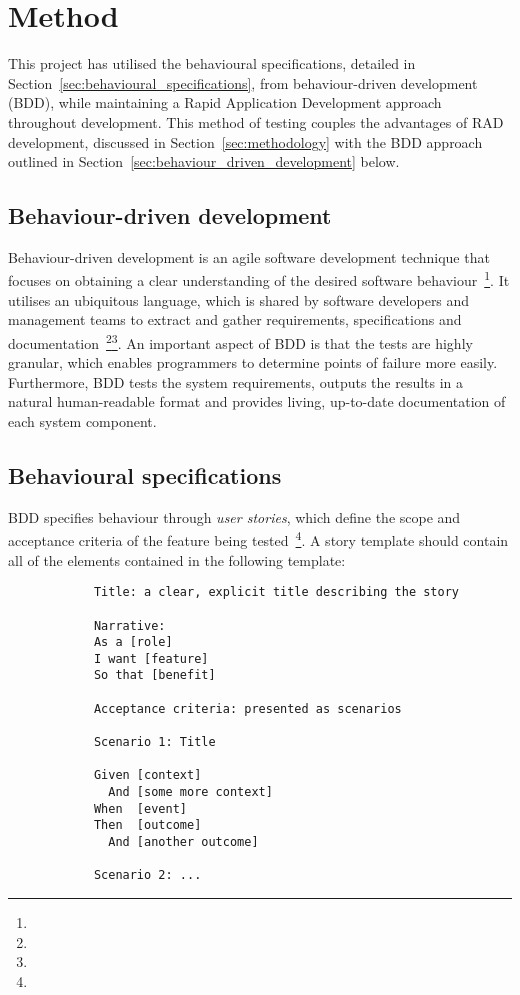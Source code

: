 \section{Method} {
\label{sec:testing_method}

	This project has utilised the behavioural specifications, detailed in Section~\ref{sec:behavioural_specifications}, from behaviour-driven development (BDD), while maintaining a Rapid Application Development approach throughout development. This method of testing couples the advantages of RAD development, discussed in Section~\ref{sec:methodology} with the BDD approach outlined in Section~\ref{sec:behaviour_driven_development} below.

	\subsection{Behaviour-driven development} {
	\label{sec:behaviour_driven_development}

		Behaviour-driven development is an agile software development technique that focuses on obtaining a clear understanding of the desired software behaviour~\footnote{}. It utilises an ubiquitous language, which is shared by software developers and management teams to extract and gather requirements, specifications and documentation~\footnote{}\footnote{}. An important aspect of BDD is that the tests are highly granular, which enables programmers to determine points of failure more easily. Furthermore, BDD tests the system requirements, outputs the results in a natural human-readable format and provides living, up-to-date documentation of each system component.

	}

	\subsection{Behavioural specifications} {
	\label{sec:behavioural_specifications}

		BDD specifies behaviour through \emph{user stories}, which define the scope and acceptance criteria of the feature being tested~\footnote{}. A story template should contain all of the elements contained in the following template:

		\begin{verbatim}
			Title: a clear, explicit title describing the story
 
			Narrative:
			As a [role]
			I want [feature]
			So that [benefit]
			 
			Acceptance criteria: presented as scenarios
			 
			Scenario 1: Title

			Given [context]
			  And [some more context]
			When  [event]
			Then  [outcome]
			  And [another outcome]

	  		Scenario 2: ...
		\end{verbatim}

	}

}

